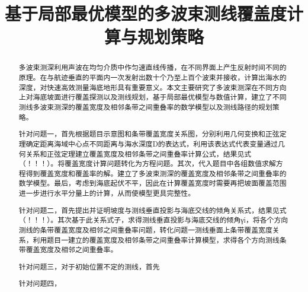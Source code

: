 \documentclass[withoutpreface,bwprint]{cumcmthesis} %
\title{基于局部最优模型的多波束测线覆盖度计算与规划策略}
\begin{document}
 \maketitle
 \begin{abstract}
多波束测深利用声波在均匀介质中作匀速直线传播，在不同界面上产生反射时间不同的原理。在与航迹垂直的平面内一次发射出数十个乃至上百个波束并接收，计算出海水的深度，对快速高效测量海底地形具有重要意义。本文主要研究了多波束测深在不同方向上对海底坡面进行覆盖探测以及测线规划，基于局部最优模型与数值计算，建立了不同测线多波束测深的覆盖宽度及相邻条带之间重叠率的数学模型以及测线路径的规划策略。

针对问题一，首先根据题目示意图和条带覆盖宽度关系图，分别利用几何变换和正弦定理确定距离海域中心点不同距离与海水深度D的表达式，利用该表达式代表变量通过几何关系和正弦定理建立覆盖宽度及相邻条带之间重叠率计算公式，结果见式（！！！）。将覆盖宽度计算问题转化为方程问题。其次，代入题目中各组数值求解方程得到覆盖宽度和覆盖率的解。建立了多波束测深的覆盖宽度及相邻条带之间重叠率的数学模型。最后，考虑到海底起伏不平，因此在计算覆盖宽度时需要再把坡面覆盖范围进一步进行水平分量上的计算，从而使模型更具完整性。

针对问题二，首先提出并证明坡度与测线垂直投影与海底交线的倾角关系式，结果见式（！！！）。其次基于此关系式子，求得测线垂直投影与海底交线的倾角γi，将各个方向测线的条带覆盖宽度及相邻之间重叠率问题，转化问题一测线垂面上条带覆盖宽度关系，利用题目一建立的覆盖宽度及相邻条带之间重叠率计算模型，求得各个方向测线条带覆盖宽度及相邻之间重叠率。

针对问题三，对于初始位置不定的测线，首先

针对问题四，





\end{abstract}
\end{document}
